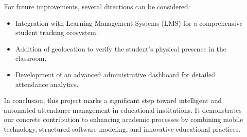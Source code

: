 \documentclass[12pt,a4paper]{report}
\begin{document}
For future improvements, several directions can be considered:
\begin{itemize}
  \item Integration with Learning Management Systems (LMS) for a comprehensive student tracking ecosystem.
  \item Addition of geolocation to verify the student's physical presence in the classroom.
  \item Development of an advanced administrative dashboard for detailed attendance analytics.
\end{itemize}

In conclusion, this project marks a significant step toward intelligent and automated attendance management in educational institutions. It demonstrates our concrete contribution to enhancing academic processes by combining mobile technology, structured software modeling, and innovative educational practices.




% 
% 
% 
% 
% 
% 
\end{document}
